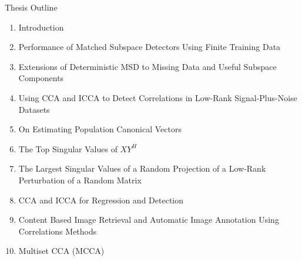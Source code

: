 \documentclass[8pt]{beamer}
\begin{document}
\begin{frame}{Thesis Outline}
  \begin{enumerate}
  \item \textcolor{textlightgray}{Introduction}
  \item \textcolor{textlightgray}{Performance of Matched Subspace Detectors Using Finite
      Training Data} 
  \item \textcolor{textlightgray}{Extensions of Deterministic MSD to Missing Data and
      Useful Subspace Components} 
  \item {\color{texthigh}Using CCA and ICCA to Detect Correlations in Low-Rank Signal-Plus-Noise Datasets}
  \item \textcolor{textred}{On Estimating Population Canonical Vectors}
  \item \textcolor{textred}{The Top Singular Values of $XY^H$}
  \item \textcolor{textred}{The Largest Singular Values of a Random Projection of a Low-Rank Perturbation of a Random Matrix} 
  \item \textcolor{textlightgray}{CCA and ICCA for Regression and Detection} 
  \item \textcolor{textred}{Content Based Image Retrieval and Automatic Image Annotation Using Correlations Methods}
  \item \textcolor{textred}{Multiset CCA (MCCA)}
  \end{enumerate}

\end{frame}
\end{document}
